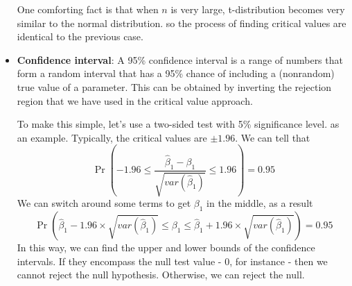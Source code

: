 \documentclass[12pt]{article}
\theoremstyle{definition}
\theoremstyle{property}
\theoremstyle{assumption}
\theoremstyle{example}
\theoremstyle{comment}
\begin{document}
\begin{itemize}
One comforting fact is that when $n$ is very large, t-distribution becomes very similar to the normal distribution. so the process of finding critical values are identical to the previous case.
\item \textbf{Confidence interval}: A 95\% confidence interval is a range of numbers that form a random interval that has a 95\% chance of including a (nonrandom) true value of a parameter. This can be obtained by inverting the rejection region that we have used in the critical value approach. \par\medskip
To make this simple, let's use a two-sided test  with 5\% significance level. as an example. Typically, the critical values are $\pm1.96$. We can tell that 
\[
\Pr\left(-1.96\leq \frac{\hat{\beta}_1-\beta_1}{\sqrt{var(\hat{\beta}_1)}} \leq1.96\right)=0.95
\]
We can switch around some terms to get $\beta_1$ in the middle, as a result
\[
\Pr\left(\hat{\beta}_1-1.96\times\sqrt{var(\hat{\beta}_1)} \leq \beta_1 \leq\hat{\beta}_1+1.96\times\sqrt{var(\hat{\beta}_1)}\right)=0.95
\]
In this way, we can find the upper and lower bounds of the confidence intervals. If they encompass the null test value - 0, for instance - then we cannot reject the null hypothesis. Otherwise, we can reject the null. 
\end{itemize}
\end{document}
